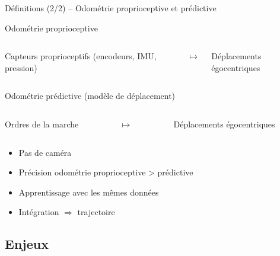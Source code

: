 \begin{frame}{Définitions (2/2) -- Odométrie proprioceptive et prédictive}
    \begin{block}{Odométrie proprioceptive}
        \begin{columns}
            \begin{column}{0.4\textwidth}
                Capteurs proprioceptifs
                (encodeurs, IMU, pression)
            \end{column}
            \begin{column}{0.2\textwidth}
                $\longmapsto$
            \end{column}
            \begin{column}{0.3\textwidth}
                Déplacements égocentriques
            \end{column}
        \end{columns}
    \end{block}
    \begin{block}{Odométrie prédictive (modèle de déplacement)}
        \begin{columns}
            \begin{column}{0.4\textwidth}
                Ordres de la marche
            \end{column}
            \begin{column}{0.2\textwidth}
                $\longmapsto$
            \end{column}
            \begin{column}{0.3\textwidth}
                Déplacements égocentriques
            \end{column}
        \end{columns}
    \end{block}
    \vspace{2.0em}
    \begin{itemize}
        \item Pas de caméra
        \item Précision odométrie proprioceptive > prédictive
        \item Apprentissage avec les mêmes données
        \item Intégration $\Rightarrow$ trajectoire
    \end{itemize}
\end{frame}

\subsection{Enjeux}

